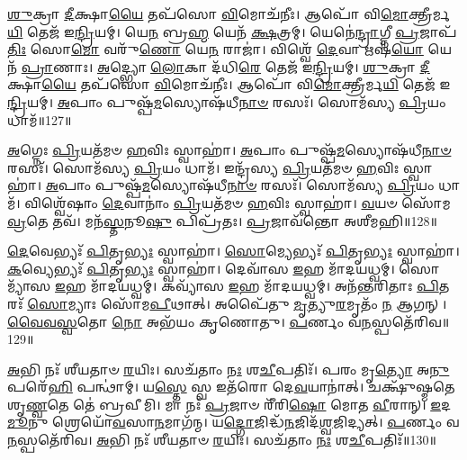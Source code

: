 \-\ul{𑌶𑍁}\-𑌕𑍍𑌰𑌾 \ul{𑌦𑍀}\-𑌕𑍍𑌷𑌾\-\ul{𑌯𑍈} 𑌤𑌪᳴𑌸𑍋 \ul{𑌵𑌿}\-𑌮𑍋𑌚᳴𑌨𑍀𑌃।
𑌆𑌪𑍋᳴ 𑌵𑌿\-\ul{𑌮𑍋}\-𑌕𑍍𑌤𑍍𑌰𑍀𑌰𑍍𑌮\-\ul{𑌯𑌿} 𑌤𑍇𑌜᳴ 𑌇\-\ul{𑌨𑍍𑌦𑍍𑌰𑌿}\-𑌯𑌮𑍍।
𑌯𑍇\-\ul{𑌨} 𑌬𑍍𑌰\-\ul{𑌹𑍍𑌮} 𑌯𑍇𑌨᳴ \ul{𑌕𑍍𑌷}\-𑌤𑍍𑌰𑌮𑍍।
𑌯𑍇𑌨𑍇॑\-\ul{𑌨𑍍𑌦𑍍𑌰𑌾}\-𑌗𑍍𑌨𑍀 \ul{𑌪𑍍𑌰}\-𑌜𑌾\-𑌪᳴\-\ul{𑌤𑌿𑌃} 𑌸𑍋\-\ul{𑌮𑍋} 𑌵𑌰𑍁᳴\-\ul{𑌣𑍋} 𑌯𑍇\-\ul{𑌨} 𑌰𑌾𑌜𑌾॑।
𑌵𑌿𑌶𑍍𑌵𑍇᳴ \ul{𑌦𑍇}\-𑌵𑌾 𑌋𑌷᳴\-\ul{𑌯𑍋} 𑌯𑍇𑌨᳴ \ul{𑌪𑍍𑌰𑌾}\-𑌣𑌾𑌃।
\-\ul{𑌅}\-𑌦𑍍𑌭𑍍𑌯𑍋 \ul{𑌲𑍋}\-𑌕𑌾 𑌦᳴𑌧𑌿\-\ul{𑌰𑍇} 𑌤𑍇𑌜᳴ 𑌇\-\ul{𑌨𑍍𑌦𑍍𑌰𑌿}\-𑌯𑌮𑍍।
\-\ul{𑌶𑍁}\-𑌕𑍍𑌰𑌾 \ul{𑌦𑍀}\-𑌕𑍍𑌷𑌾\-\ul{𑌯𑍈} 𑌤𑌪᳴𑌸𑍋 \ul{𑌵𑌿}\-𑌮𑍋𑌚᳴𑌨𑍀𑌃।
𑌆𑌪𑍋᳴ 𑌵𑌿\-\ul{𑌮𑍋}\-𑌕𑍍𑌤𑍍𑌰𑍀𑌰𑍍𑌮\-\ul{𑌯𑌿} 𑌤𑍇𑌜᳴ 𑌇\-\ul{𑌨𑍍𑌦𑍍𑌰𑌿}\-𑌯𑌮𑍍।
\-\ul{𑌅}\-𑌪𑌾𑌂 𑌪𑍁𑌷𑍍𑌪᳴\-\ul{𑌮}\-𑌸𑍍𑌯𑍋𑌷᳴𑌧𑍀\-\ul{𑌨𑌾}\-\-\ul{𑍞} 𑌰𑌸𑌃᳴।
𑌸𑍋𑌮᳴𑌸𑍍𑌯 \ul{𑌪𑍍𑌰𑌿}\-𑌯𑌂 𑌧𑌾𑌮᳴॥127॥

\-\ul{𑌅}\-𑌗𑍍𑌨𑍇𑌃 \ul{𑌪𑍍𑌰𑌿}\-𑌯𑌤᳴𑌮𑍞 \ul{𑌹}\-𑌵𑌿𑌃 𑌸𑍍𑌵𑌾𑌹𑌾॑।
\-\ul{𑌅}\-𑌪𑌾𑌂 𑌪𑍁𑌷𑍍𑌪᳴\-\ul{𑌮}\-𑌸𑍍𑌯𑍋𑌷᳴𑌧𑍀\-\ul{𑌨𑌾}\-\-\ul{𑍞} 𑌰𑌸𑌃᳴।
𑌸𑍋𑌮᳴𑌸𑍍𑌯 \ul{𑌪𑍍𑌰𑌿}\-𑌯𑌂 𑌧𑌾𑌮᳴।
𑌇𑌨𑍍𑌦𑍍𑌰᳴𑌸𑍍𑌯 \ul{𑌪𑍍𑌰𑌿}\-𑌯𑌤᳴𑌮𑍞 \ul{𑌹}\-𑌵𑌿𑌃 𑌸𑍍𑌵𑌾𑌹𑌾॑।
\-\ul{𑌅}\-𑌪𑌾𑌂 𑌪𑍁𑌷𑍍𑌪᳴\-\ul{𑌮}\-𑌸𑍍𑌯𑍋𑌷᳴𑌧𑍀\-\ul{𑌨𑌾}\-\-\ul{𑍞} 𑌰𑌸𑌃᳴।
𑌸𑍋𑌮᳴𑌸𑍍𑌯 \ul{𑌪𑍍𑌰𑌿}\-𑌯𑌂 𑌧𑌾𑌮᳴।
𑌵𑌿𑌶𑍍𑌵𑍇᳴𑌷𑌾𑌂 \ul{𑌦𑍇}\-𑌵𑌾𑌨𑌾𑌂॑ \ul{𑌪𑍍𑌰𑌿}\-𑌯𑌤᳴𑌮𑍞 \ul{𑌹}\-𑌵𑌿𑌃 𑌸𑍍𑌵𑌾𑌹𑌾॑।
\-\ul{𑌵}\-𑌯𑍞 𑌸𑍋᳴𑌮 \ul{𑌵𑍍𑌰}\-𑌤𑍇 𑌤𑌵᳴।
𑌮𑌨᳴\-\ul{𑌸𑍍𑌤}\-𑌨𑍂\-\ul{𑌷𑍁} 𑌪𑌿𑌪𑍍𑌰᳴𑌤𑌃।
\-\ul{𑌪𑍍𑌰}\-𑌜𑌾𑌵᳴𑌨𑍍𑌤𑍋 𑌅𑌶𑍀𑌮𑌹𑌿॥128॥

\-\ul{𑌦𑍇}\-𑌵𑍇𑌭𑍍𑌯𑌃᳴ \ul{𑌪𑌿}\-𑌤𑍃\-\ul{𑌭𑍍𑌯𑌃} 𑌸𑍍𑌵𑌾𑌹𑌾॑।
\-\ul{𑌸𑍋}\-𑌮𑍍𑌯𑍇𑌭𑍍𑌯𑌃᳴ \ul{𑌪𑌿}\-𑌤𑍃\-\ul{𑌭𑍍𑌯𑌃} 𑌸𑍍𑌵𑌾𑌹𑌾॑।
\-\ul{𑌕}\-𑌵𑍍𑌯𑍇𑌭𑍍𑌯𑌃᳴ \ul{𑌪𑌿}\-𑌤𑍃\-\ul{𑌭𑍍𑌯𑌃} 𑌸𑍍𑌵𑌾𑌹𑌾॑।
𑌦𑍇𑌵𑌾᳴𑌸 \ul{𑌇}\-𑌹 𑌮𑌾᳴𑌦𑌯𑌧𑍍𑌵𑌮𑍍।
𑌸𑍋𑌮𑍍𑌯𑌾᳴𑌸 \ul{𑌇}\-𑌹 𑌮𑌾᳴𑌦𑌯𑌧𑍍𑌵𑌮𑍍।
𑌕𑌵𑍍𑌯𑌾᳴𑌸 \ul{𑌇}\-𑌹 𑌮𑌾᳴𑌦𑌯𑌧𑍍𑌵𑌮𑍍।
𑌅𑌨᳴𑌨𑍍𑌤𑌰𑌿𑌤𑌾𑌃 \ul{𑌪𑌿}\-𑌤𑌰𑌃᳴ \ul{𑌸𑍋}\-𑌮𑍍𑌯𑌾𑌃 𑌸𑍋᳴𑌮\-\ul{𑌪𑍀}\-𑌥𑌾𑌤𑍍।
𑌅𑌪𑍈᳴𑌤𑍁 \ul{𑌮𑍃}\-𑌤𑍍𑌯𑍁\-\ul{𑌰}\-𑌮𑍃𑌤𑌂᳴ \ul{𑌨} 𑌆𑌗𑌨𑍍।
\-\ul{𑌵𑍈}\-\-\ul{𑌵}\-\-\ul{𑌸𑍍𑌵}\-𑌤𑍋 \ul{𑌨𑍋} 𑌅𑌭᳴𑌯𑌂 𑌕𑍃𑌣𑍋𑌤𑍁।
\-\ul{𑌪}\-𑌰𑍍𑌣𑌂 𑌵\-\ul{𑌨}\-𑌸𑍍𑌪𑌤𑍇᳴𑌰𑌿𑌵॥129॥

\-\ul{𑌅}\-𑌭𑌿 𑌨𑌃᳴ 𑌶𑍀𑌯𑌤𑌾𑍞 \ul{𑌰}\-𑌯𑌿𑌃।
𑌸𑌚᳴𑌤𑌾𑌂 \ul{𑌨𑌃} 𑌶\-\ul{𑌚𑍀}\-𑌪𑌤𑌿𑌃᳴।
𑌪𑌰𑌂 𑌮𑍃\-\ul{𑌤𑍍𑌯𑍋} 𑌅\-\ul{𑌨𑍁} 𑌪𑌰𑍇᳴\-\ul{𑌹𑌿} 𑌪𑌨𑍍𑌥𑌾॑𑌮𑍍।
𑌯\-\ul{𑌸𑍍𑌤𑍇} 𑌸𑍍𑌵 𑌇𑌤᳴𑌰𑍋 𑌦𑍇\-\ul{𑌵}\-𑌯𑌾𑌨𑌾॑𑌤𑍍।
𑌚𑌕𑍍𑌷𑍁᳴𑌷𑍍𑌮𑌤𑍇 𑌶𑍃\-\ul{𑌣𑍍𑌵}\-𑌤𑍇 𑌤𑍇॑ 𑌬𑍍𑌰𑌵𑍀𑌮𑌿।
𑌮𑌾 𑌨𑌃᳴ \ul{𑌪𑍍𑌰}\-𑌜𑌾𑍞 𑌰𑍀᳴𑌰𑌿\-\ul{𑌷𑍋} 𑌮𑍋𑌤 \ul{𑌵𑍀}\-𑌰𑌾𑌨𑍍।
\-\ul{𑌇}\-𑌦\-\ul{𑌮𑍂}\-𑌨𑍁 𑌶𑍍𑌰𑍇𑌯𑍋᳴\-\ul{𑌵}\-𑌸𑌾\-\ul{𑌨}\-𑌮𑌾𑌗᳴𑌨𑍍𑌮।
𑌯\-\ul{𑌦𑍍𑌗𑍋}\-𑌜𑌿𑌦𑍍𑌧᳴\-\ul{𑌨}\-𑌜𑌿𑌦᳴\-\ul{𑌶𑍍𑌵}\-𑌜𑌿𑌦𑍍𑌯𑌤𑍍।
\-\ul{𑌪}\-𑌰𑍍𑌣𑌂 𑌵\-\ul{𑌨}\-𑌸𑍍𑌪𑌤𑍇᳴𑌰𑌿𑌵।
\-\ul{𑌅}\-𑌭𑌿 𑌨𑌃᳴ 𑌶𑍀𑌯𑌤𑌾𑍞 \ul{𑌰}\-𑌯𑌿𑌃।
𑌸𑌚᳴𑌤𑌾𑌂 \ul{𑌨𑌃} 𑌶\-\ul{𑌚𑍀}\-𑌪𑌤𑌿𑌃᳴॥130॥\anuvakamend[𑌵\-\ul{𑌨}\-𑌸𑍍𑌪𑌤𑌾᳴\-\ul{𑌵}\-𑌦𑍍𑌭𑍍𑌯𑍋 \ul{𑌲𑍋}\-𑌕𑌾 𑌦᳴𑌧𑌿\-\ul{𑌰𑍇} 𑌤𑍇𑌜᳴ 𑌇\-\ul{𑌨𑍍𑌦𑍍𑌰𑌿}\-𑌯𑌂 𑌧𑌾𑌮𑌾᳴𑌶𑍀𑌮𑌹𑍀\-\ul{𑌵𑌾}\-𑌭𑌿𑌨𑌃᳴ 𑌶𑍀𑌯𑌤𑌾𑍞 \ul{𑌰}\-𑌯𑌿𑌰𑍇𑌕𑌂᳴ 𑌚]




\setcounter{anuvakam}{0}

